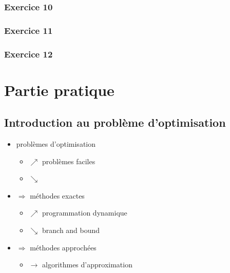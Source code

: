 \documentclass[a4paper, 12pt]{article}
\begin{document}
\subsubsection*{Exercice 10}


\subsubsection*{Exercice 11}


\subsubsection*{Exercice 12}


\pagebreak

\section{Partie pratique}

\subsection{Introduction au problème d'optimisation}

\begin{itemize}
  \item problèmes d'optimisation 
    \begin{itemize}
    \item[] $\nearrow$ problèmes faciles
    \item[] $\searrow$ 
    \end{itemize}
  \item  $\Rightarrow$ méthodes exactes 
    \begin{itemize}
    \item[] $\nearrow$ programmation dynamique
    \item[] $\searrow$ branch and bound
    \end{itemize}
  \item  $\Rightarrow$ méthodes approchées
    \begin{itemize}
    \item[] $\longrightarrow$ algorithmes d'approximation
    \end{itemize}
\end{itemize}
    
\end{document}
